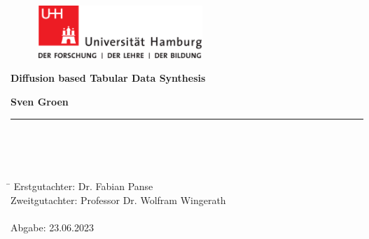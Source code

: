\begin{titlepage}

  \setcounter{page}{-1}

	\begin{figure}[h]
		\begin{minipage}[b]{62mm}
			\includegraphics[width=62mm]{images/unilogo}
		\end{minipage}
		\hspace{4cm}
	\end{figure}

	\vfill
	
	\begin{center}
		\vspace{14mm}
		\noindent \textbf{\huge
		  Diffusion based Tabular Data Synthesis
		}
		\vspace{60mm}	
	\end{center}
	
	\vfill
	
	\noindent \textbf{Sven Groen} \\
	\noindent \rule{\textwidth}{0.4mm} 
	 \\
	 \\
	 \\
	\begin{tabbing}
	\hspace{8em} \=  \kill
	Erstgutachter: \> Dr. Fabian Panse \\
	Zweitgutachter: \> Professor Dr. Wolfram Wingerath \\
	~ \\
	Abgabe: 23.06.2023
	\end{tabbing}

\end{titlepage}

